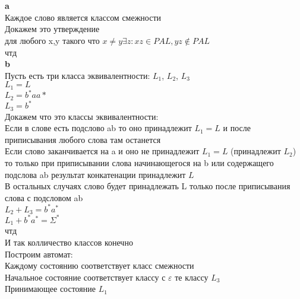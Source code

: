 \documentclass[a4paper,12pt]{article}
\begin{document}
\section{}
\textbf{a}\\
Каждое слово является классом смежности\\
Докажем это утверждение\\
для любого x,y такого что $x\neq y \exists z: xz\in PAL, yz\notin PAL$\\
чтд\\
\textbf{b}\\
Пусть есть три класса эквивалентности: $L_{1}$, $L_{2}$, $L_{3}$\\
$L_{1} = L$\\
$L_{2} = b^*aa*$\\
$L_{3} = b^*$\\
Докажем что это классы эквивалентности:\\
Если в слове есть подслово ab то оно принадлежит $L_{1} = L$ и после приписывания любого слова там останется\\
Если слово заканчивается на a и оно не принадлежит $L_{1} = L$ (принадлежит $L_{2}$) то только при приписывании слова начинающегося на b или содержащего подслова ab результат конкатенации принадлежит $L$\\
В остальных случаях слово будет принадлежать L только после приписывания слова с подсловом ab\\
$L_{2} + L_{3} = b^*a^*$\\
$L_{1} + b^*a^* = \Sigma^*$\\
чтд\\
И так колличество классов конечно\\
Построим автомат:\\
Каждому состоянию соответствует класс смежности\\
Начальное состояние соответствует классу с $\varepsilon$ те классу $L_{3}$\\
Принимающее состояние $L_{1}$\\
\end{document}
